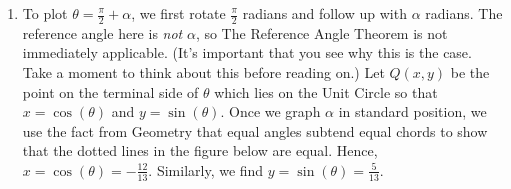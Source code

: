 \documentclass{ximera}
\begin{document}
\begin{example}
\begin{explanation}
\begin{enumerate}
\begin{enumerate}
\begin{image}

\end{image}

\item  To plot $\theta = \frac{\pi}{2} + \alpha$, we first rotate $\frac{\pi}{2}$ radians and follow up with $\alpha$ radians.  The reference angle here is \textit{not} $\alpha$, so The Reference Angle Theorem is not immediately applicable.  (It's important that you see why this is the case.  Take a moment to think about this before reading on.)  Let $Q(x,y)$ be the point on the terminal side of $\theta$ which lies on the Unit Circle so that $x = \cos(\theta)$ and $y = \sin(\theta)$.   Once we graph $\alpha$ in standard position, we use the fact from Geometry that equal angles subtend equal chords to show that the dotted lines in the figure below are equal.  Hence,  $x = \cos(\theta) = -\frac{12}{13}$.  Similarly, we find  $y = \sin(\theta) = \frac{5}{13}$. 

\begin{image}
\end{image}
\end{enumerate}
\end{enumerate}
\end{explanation}
\end{example}
\end{document}
